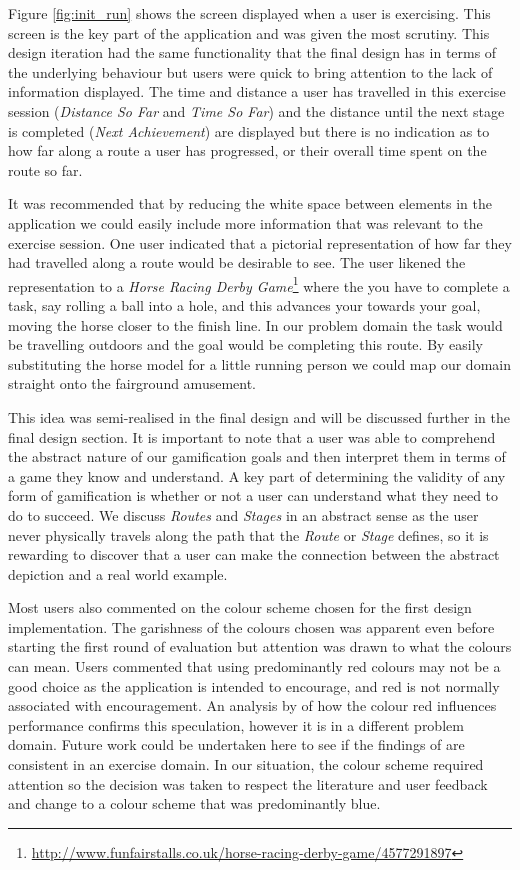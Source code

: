 Figure \ref{fig:init_run} shows the screen displayed when a user is
exercising. This screen is the key part of the application and was
given the most scrutiny. This design iteration had the same
functionality that the final design has in terms of the underlying
behaviour but users were quick to bring attention to the lack of
information displayed. The time and distance a user has travelled in
this exercise session (\emph{Distance So Far} and \emph{Time So Far})
and the distance until the next stage is completed (\emph{Next
  Achievement}) are displayed but there is no indication as to how far
along a route a user has progressed, or their overall time spent on
the route so far.  

It was recommended that by reducing the white space between elements
in the application we could easily include more information that was
relevant to the exercise session. One user indicated that a pictorial
representation of how far they had travelled along a route would be
desirable to see. The user likened the representation to a \emph{Horse
  Racing Derby
  Game}\footnote{\url{http://www.funfairstalls.co.uk/horse-racing-derby-game/4577291897}}
where the you have to complete a task, say rolling a ball into a hole,
and this advances your towards your goal, moving the horse closer to
the finish line. In our problem domain the task would be travelling
outdoors and the goal would be completing this route. By easily
substituting the horse model for a little running person we could map
our domain straight onto the fairground amusement. 

This idea was semi-realised in the final design and will be discussed
further in the final design section. It is important to note that a
user was able to comprehend the abstract nature of our gamification
goals and then interpret them in terms of a game they know and
understand. A key part of determining the validity of any form of
gamification is whether or not a user can understand what they need to
do to succeed. We discuss \emph{Routes} and \emph{Stages} in an
abstract sense as the user never physically travels along the path
that the \emph{Route} or \emph{Stage} defines, so it is rewarding to
discover that a user can make the connection between the abstract
depiction and a real world example.

Most users also commented on the colour scheme chosen for the first
design implementation. The garishness of the colours chosen was
apparent even before starting the first round of evaluation but
attention was drawn to what the colours can mean. Users commented that
using predominantly red colours may not be a good choice as the
application is intended to encourage, and red is not normally
associated with encouragement. An analysis by \citet{colours_red}
of how the colour red influences performance confirms this
speculation, however it is in a different problem domain. Future work
could be undertaken here to see if the findings of \citet{colours_red}
are consistent in an exercise domain. In our situation, the colour
scheme required attention so the decision was taken to respect the
literature and user feedback and change to a colour scheme that was
predominantly blue.

